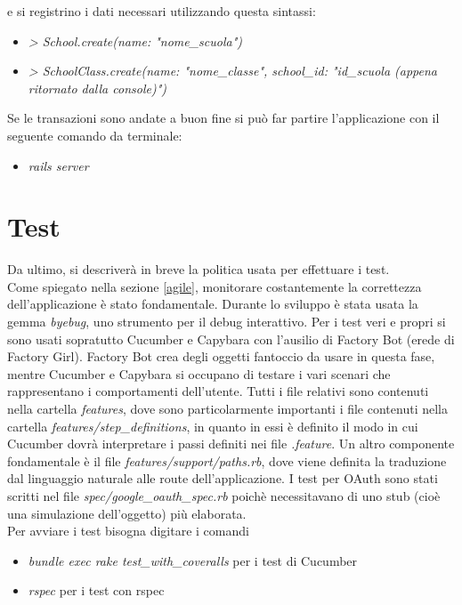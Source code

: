 \documentclass[Lau, binding=0.6cm, oneside]{sapthesis}
\begin{document}
e si registrino i dati necessari utilizzando questa sintassi:
\begin{itemize}
	\item \textit{> School.create(name: "nome\_scuola")}
	\item \textit{> SchoolClass.create(name: "nome\_classe", school\_id: "id\_scuola (appena ritornato dalla console)")}
\end{itemize}

Se le transazioni sono andate a buon fine si può far partire l'applicazione con il seguente comando da terminale: 
\begin{itemize}
	\item \textit{rails server}
\end{itemize}

\section{Test} \label{test}

Da ultimo, si descriverà in breve la politica usata per effettuare i test.\\ 
Come spiegato nella sezione \ref{agile}, monitorare costantemente la correttezza dell'applicazione è stato fondamentale. Durante lo sviluppo è stata usata la gemma \textit{byebug}, uno strumento per il debug interattivo. Per i test veri e propri si sono usati sopratutto Cucumber e Capybara con l'ausilio di Factory Bot (erede di Factory Girl). Factory Bot crea degli oggetti fantoccio da usare in questa fase, mentre Cucumber e Capybara si occupano di testare i vari scenari che rappresentano i comportamenti dell'utente. Tutti i file relativi sono contenuti nella cartella \textit{features}, dove sono particolarmente importanti i file contenuti nella cartella \textit{features/step\_definitions}, in quanto in essi è definito il modo in cui Cucumber dovrà interpretare i passi definiti nei file \textit{.feature}. Un altro componente fondamentale è il file \textit{features/support/paths.rb}, dove viene definita la traduzione dal linguaggio naturale alle route dell'applicazione. I test per OAuth sono stati scritti nel file \textit{spec/google\_oauth\_spec.rb} poichè necessitavano di uno stub (cioè una simulazione dell'oggetto) più elaborata.\\
Per avviare i test bisogna digitare i comandi 
\begin{itemize}
	\item \textit{bundle exec rake test\_with\_coveralls} per i test di Cucumber
	\item \textit{rspec} per i test con rspec
\end{itemize}
\end{document}
